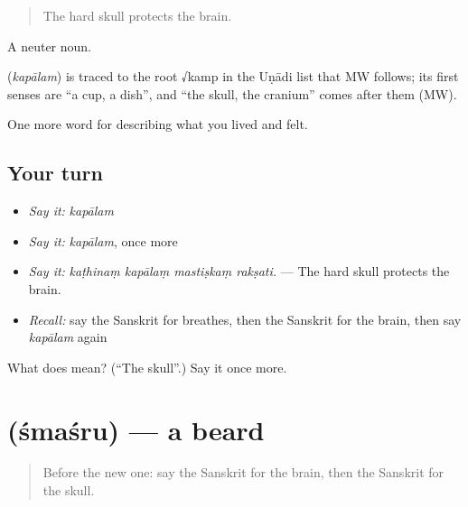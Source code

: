 \begin{quote}
The hard skull protects the brain.
\end{quote}

A neuter noun.

\begin{cousinweb}
\textbf{} (\emph{kapālam}) is traced to the root √kamp in the Uṇādi list that MW follows; its first senses are \textquotedblleft{}a cup, a dish\textquotedblright{}, and \textquotedblleft{}the skull, the cranium\textquotedblright{} comes after them (MW).
\end{cousinweb}

\begin{grammarlens}[title={What you've built}]
One more word for describing what you lived and felt.
\end{grammarlens}

\subsection*{Your turn}
\begin{itemize}
\raggedright
  \item \emph{Say it:} \emph{kapālam}
  \item \emph{Say it:} \emph{kapālam}, once more
  \item \emph{Say it:} \emph{kaṭhinaṃ kapālaṃ mastiṣkaṃ rakṣati.} — The hard skull protects the brain.
  \item \emph{Recall:} say the Sanskrit for breathes, then the Sanskrit for the brain, then say \emph{kapālam} again
\end{itemize}

\begin{tcolorbox}[breakable,colback=teal!4,colframe=teal!35!black,title={Before you move on}]
What does  mean? (\textquotedblleft{}The skull\textquotedblright{}.) Say it once more.
\end{tcolorbox}
\section[\texorpdfstring{\sk{श्मश्रु} (śmaśru)}{श्मश्रु (śmaśru)}]{ (śmaśru) — a beard}

\label{lesson:SA-C471-smasru}



\begin{quote}
Before the new one: say the Sanskrit for the brain, then the Sanskrit for the skull.
\end{quote}

